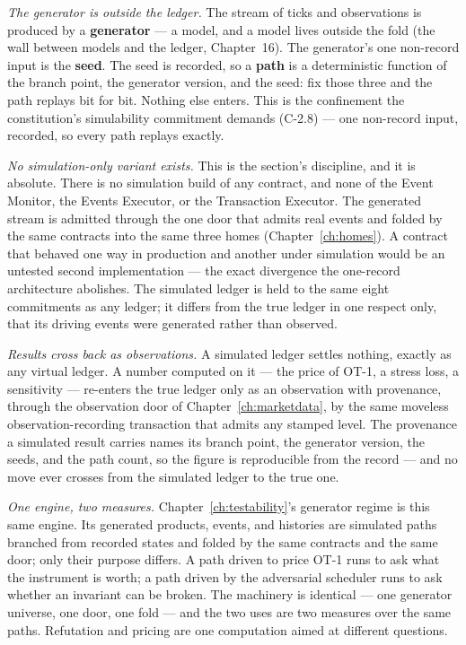\emph{The generator is outside the ledger.} The stream of ticks and observations is produced
by a \textbf{generator} --- a model, and a model lives outside the fold (the wall between
models and the ledger, Chapter~16). The generator's one
non-record input is the \textbf{seed}. The seed is recorded, so a \textbf{path} is a
deterministic function of the branch point, the generator version, and the seed: fix those
three and the path replays bit for bit. Nothing else enters. This is the confinement the
constitution's simulability commitment demands (C-2.8) --- one non-record input, recorded,
so every path replays exactly.

\emph{No simulation-only variant exists.} This is the section's discipline, and it is
absolute. There is no simulation build of any contract, and none of the Event Monitor, the
Events Executor, or the Transaction Executor. The generated stream is admitted through the
one door that admits real events and folded by the same contracts into the same three homes
(Chapter~\ref{ch:homes}). A contract that behaved one way in production and another under
simulation would be an untested second implementation --- the exact divergence the
one-record architecture abolishes. The simulated ledger is held to the same eight
commitments as any ledger; it differs from the true ledger in one respect only, that its
driving events were generated rather than observed.

\emph{Results cross back as observations.} A simulated ledger settles nothing, exactly as
any virtual ledger. A number computed on it --- the price of OT-1, a stress loss, a
sensitivity --- re-enters the true ledger only as an observation with provenance, through
the observation door of Chapter~\ref{ch:marketdata}, by the same moveless
observation-recording transaction that admits any stamped level. The provenance a simulated
result carries names its branch point, the generator version, the seeds, and the path count,
so the figure is reproducible from the record --- and no move ever crosses from the
simulated ledger to the true one.

\emph{One engine, two measures.} Chapter~\ref{ch:testability}'s generator regime is this same
engine. Its generated products, events, and histories are simulated paths branched from
recorded states and folded by the same contracts and the same door; only their purpose
differs. A path driven to price OT-1 runs to ask what the instrument is worth; a path driven
by the adversarial scheduler runs to ask whether an invariant can be broken. The machinery
is identical --- one generator universe, one door, one fold --- and the two uses are two
measures over the same paths. Refutation and pricing are one computation aimed at different
questions.

